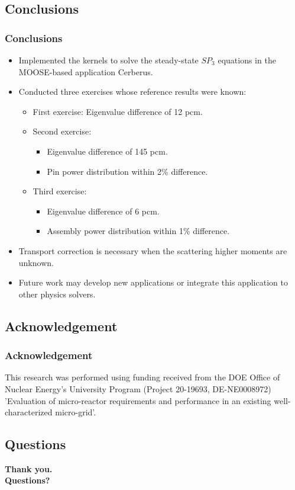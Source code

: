 \subsection{Conclusions}

\begin{frame}
\frametitle{Conclusions}

	\begin{itemize}
    \item Implemented the kernels to solve the steady-state $SP_3$ equations in the MOOSE-based application Cerberus.
    \item Conducted three exercises whose reference results were known:
    \begin{itemize}
      \item First exercise: Eigenvalue difference of 12 pcm.
      \item Second exercise:
      \begin{itemize}
        \item Eigenvalue difference of 145 pcm.
        \item Pin power distribution within 2\% difference.
      \end{itemize}
      \item Third exercise:
      \begin{itemize}
        \item Eigenvalue difference of 6 pcm.
        \item Assembly power distribution within 1\% difference.
      \end{itemize}
    \end{itemize}
    \item Transport correction is necessary when the scattering higher moments are unknown.
    \item Future work may develop new applications or integrate this application to other physics solvers.
  \end{itemize}
\end{frame}


\subsection{Acknowledgement}

\begin{frame}
\frametitle{Acknowledgement}

This research was performed using funding received from the DOE Office of Nuclear Energy’s University Program (Project 20-19693, DE-NE0008972) ’Evaluation of micro-reactor requirements and performance in an existing well-characterized micro-grid’.

\end{frame}


\subsection{Questions}

\begin{frame}
  \begin{center}
    \Huge{\textbf{Thank you.\\ Questions?}}
  \end{center}
\end{frame}
